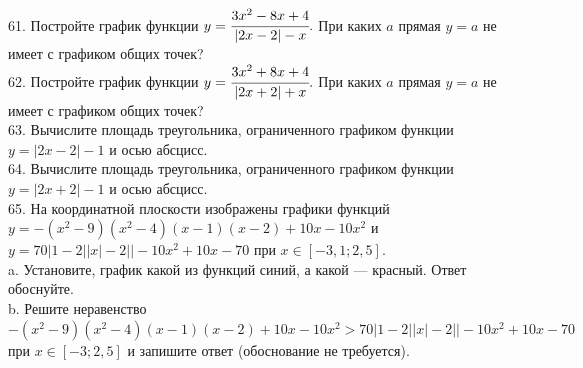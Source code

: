 \documentclass[12pt]{article}
\begin{document}
\\
61. Постройте график функции $y=\cfrac{3x^2-8x+4}{|2x-2|-x}.$ При каких $a$ прямая $y=a$ не имеет с графиком общих точек?\\
62. Постройте график функции $y=\cfrac{3x^2+8x+4}{|2x+2|+x}.$ При каких $a$ прямая $y=a$ не имеет с графиком общих точек?\\
63. Вычислите площадь треугольника, ограниченного графиком функции $y=|2x-2|-1$ и осью абсцисс.\\
64. Вычислите площадь треугольника, ограниченного графиком функции $y=|2x+2|-1$ и осью абсцисс.\\
65. На координатной плоскости изображены графики функций $y=-(x^2-9)(x^2-4)(x-1)(x-2)+10x-10x^2$ и $y=70|1-2||x|-2||-10x^2+10x-70$ при
$x\in[-3,1;2,5].$\\
a. Установите, график какой из функций синий, а какой --- красный. Ответ обоснуйте.\\
b. Решите неравенство  $-(x^2-9)(x^2-4)(x-1)(x-2)+10x-10x^2 >70|1-2||x|-2||-10x^2+10x-70$ при
$x\in[-3;2,5]$ и запишите ответ (обоснование не требуется).
\begin{center}\end{center}
\end{document}
